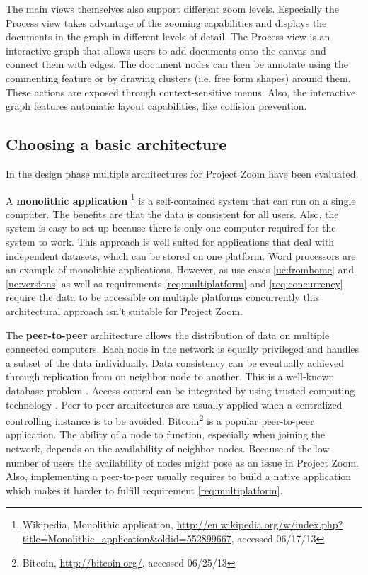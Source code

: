 The main views themselves also support different zoom levels. Especially the Process view takes advantage of the zooming capabilities and displays the documents in the graph in different levels of detail. 
The Process view is an interactive graph that allows users to add documents onto the canvas and connect them with edges. The document nodes can then be annotate using the commenting feature or by drawing clusters (i.e. free form shapes) around them. These actions are exposed through context-sensitive menus. Also, the interactive graph features automatic layout capabilities, like collision prevention.

\subsection{Choosing a basic architecture}
In the design phase multiple architectures for Project Zoom have been evaluated. 

A \textbf{monolithic application} \footnote{Wikipedia, Monolithic application, \url{http://en.wikipedia.org/w/index.php?title=Monolithic_application&oldid=552899667}, accessed 06/17/13} is a self-contained system that can run on a single computer. The benefits are that the data is consistent for all users.  Also, the system is easy to set up because there is only one computer required for the system to work. This approach is well suited for applications that deal with independent datasets, which can be stored on one platform. Word processors are an example of monolithic applications. However, as use cases \ref{uc:fromhome} and \ref{uc:versions} as well as requirements \ref{req:multiplatform} and \ref{req:concurrency} require the data to be accessible on multiple platforms concurrently this architectural approach isn't suitable for Project Zoom.

The \textbf{peer-to-peer} \cite{Schollmeier_2001} architecture allows the distribution of data on multiple connected computers. Each node in the network is equally privileged and handles a subset of the data individually. Data consistency can be eventually achieved through replication from on neighbor node to another. This is a well-known database problem \cite{Gray_1996}. Access control can be integrated by using trusted computing technology \cite{Sandhu_2005}. Peer-to-peer architectures are usually applied when a centralized controlling instance is to be avoided. Bitcoin\footnote{Bitcoin, \url{http://bitcoin.org/}, accessed 06/25/13} is a popular peer-to-peer application. The ability of a node to function, especially when joining the network, depends on the availability of neighbor nodes. Because of the low number of users the availability of nodes might pose as an issue in Project Zoom. Also, implementing a peer-to-peer usually requires to build a native application which makes it harder to fulfill requirement \ref{req:multiplatform}.

